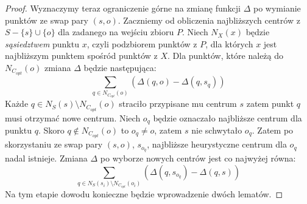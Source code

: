 \begin{proof}
    Wyznaczymy teraz ograniczenie górne na zmianę funkcji $\Delta$ po wymianie punktów ze swap pary $(s, o)$.
    Zaczniemy od obliczenia najbliższych centrów z $S - \{s\} \cup \{o\}$ dla zadanego na wejściu zbioru $P$.
    Niech $N_{X}(x)$ będzie \textit{sąsiedztwem} punktu $x$, czyli podzbiorem punktów z $P$, dla których $x$ jest najbliższym punktem spośród punktów z $X$. 
    Dla punktów, które należą do $N_{C_{opt}}(o)$ zmiana $\Delta$ będzie następująca:
    \begin{equation}
        \sum_{q \in N_{C_{opt}}(o)} (\Delta(q, o) - \Delta(q, s_{q}))
    \end{equation}
    Każde $q \in N_{S}(s) \setminus N_{C_{opt}}(o)$ straciło przypisane mu centrum $s$ zatem punkt $q$ musi otrzymać nowe centrum.
    Niech $o_{q}$ będzie oznaczało najbliższe centrum dla punktu $q$.
    Skoro $q \notin N_{C_{opt}}(o)$ to $o_{q} \neq o$, zatem $s$ nie schwytało $o_{q}$.
    Zatem po skorzystaniu ze swap pary $(s,o)$, $s_{o_{q}}$, najbliższe heurystyczne centrum dla $o_{q}$ nadal istnieje.
    Zmiana $\Delta$ po wyborze nowych centrów jest co najwyżej równa:
    \begin{equation}
        \sum_{q \in N_{S}(s_{i}) \setminus N_{C_{opt}}(o_{i})} (\Delta(q, s_{o_{q}}) - \Delta(q, s))
    \end{equation}
    Na tym etapie dowodu konieczne będzie wprowadzenie dwóch lematów.
    

\end{proof}
